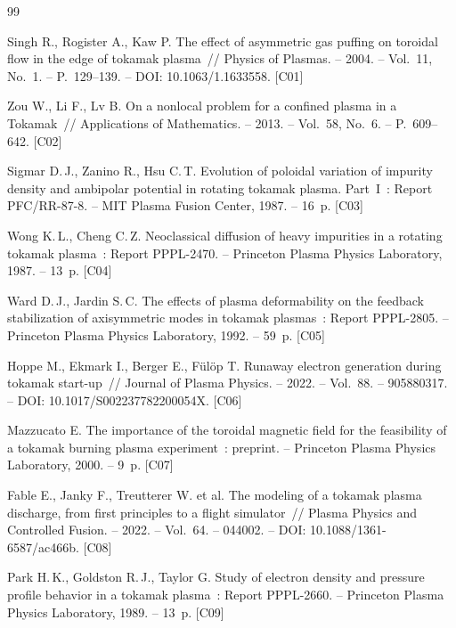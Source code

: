\begin{thebibliography}{99}
\footnotesize
{}
 Singh R., Rogister A., Kaw P. The effect of asymmetric gas puffing
  on toroidal flow in the edge of tokamak plasma~// Physics of Plasmas. -- 2004. --
  Vol.~11, No.~1. -- P.~129--139. -- DOI: 10.1063/1.1633558. [C01]

 Zou W., Li F., Lv B. On a nonlocal problem for a confined plasma in
  a Tokamak~// Applications of Mathematics. -- 2013. -- Vol.~58, No.~6. --
  P.~609--642. [C02]

 Sigmar D.\,J., Zanino R., Hsu C.\,T. Evolution of poloidal
  variation of impurity density and ambipolar potential in rotating tokamak plasma.
  Part~I~: Report PFC/RR-87-8. -- MIT Plasma Fusion Center, 1987. -- 16~p. [C03]

 Wong K.\,L., Cheng C.\,Z. Neoclassical diffusion of heavy
  impurities in a rotating tokamak plasma~: Report PPPL-2470. -- Princeton Plasma
  Physics Laboratory, 1987. -- 13~p. [C04]

 Ward D.\,J., Jardin S.\,C. The effects of plasma deformability on
  the feedback stabilization of axisymmetric modes in tokamak plasmas~: Report
  PPPL-2805. -- Princeton Plasma Physics Laboratory, 1992. -- 59~p. [C05]

 Hoppe M., Ekmark I., Berger E., Fülöp T. Runaway electron
  generation during tokamak start-up~// Journal of Plasma Physics. -- 2022. --
  Vol.~88. -- 905880317. -- DOI: 10.1017/S002237782200054X. [C06]

 Mazzucato E. The importance of the toroidal magnetic field
  for the feasibility of a tokamak burning plasma experiment~: preprint. -- Princeton
  Plasma Physics Laboratory, 2000. -- 9~p. [C07]

 Fable E., Janky F., Treutterer W. et al. The modeling of a
  tokamak plasma discharge, from first principles to a flight simulator~// Plasma
  Physics and Controlled Fusion. -- 2022. -- Vol.~64. -- 044002. --
  DOI: 10.1088/1361-6587/ac466b. [C08]

 Park H.\,K., Goldston R.\,J., Taylor G. Study of electron density
  and pressure profile behavior in a tokamak plasma~: Report PPPL-2660. -- Princeton
  Plasma Physics Laboratory, 1989. -- 13~p. [C09]


\end{thebibliography}
